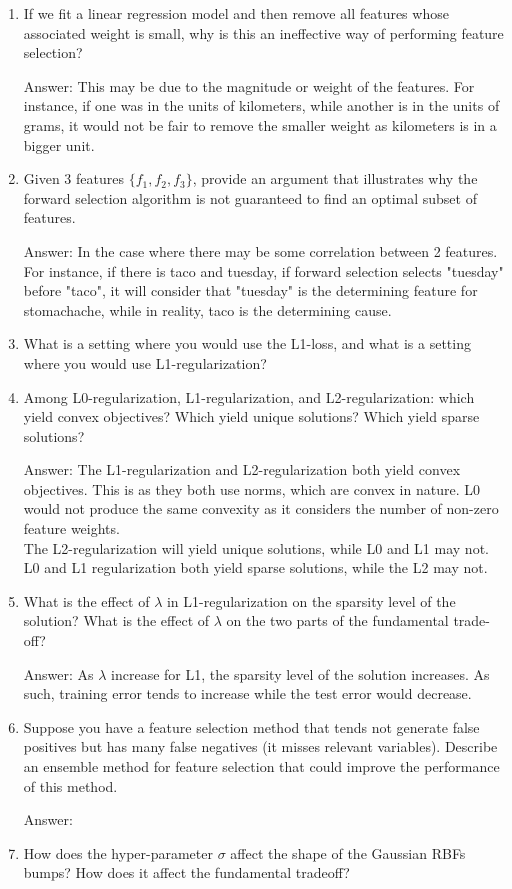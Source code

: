 \documentclass{article}
\def\ans#1{\par\gre{Answer: #1}}
\def\gre#1{{\color{gre}#1}}
\def\enum#1{\begin{enumerate}#1\end{enumerate}}
\begin{document}
\enum{
\item If we fit a linear regression model and then remove all features whose associated weight is small, why is this an ineffective way of performing feature selection?
\ans{This may be due to the magnitude or weight of the features. For instance, if one was in the units of kilometers, while another is in the units of grams, it would not be fair to remove the smaller weight as kilometers is in a bigger unit.}
\item Given $3$ features $\{f_1, f_2, f_3\}$, provide an argument that illustrates why the forward selection algorithm is not guaranteed to find an optimal subset of features.
\ans{In the case where there may be some correlation between 2 features. For instance, if there is taco and tuesday, if forward selection selects "tuesday" before "taco", it will consider that "tuesday" is the determining feature for stomachache, while in reality, taco is the determining cause.}
\item What is a setting where you would use the L1-loss, and what is a setting where you would use L1-regularization?
\item Among L0-regularization, L1-regularization, and L2-regularization: which yield convex objectives? Which yield unique solutions? Which yield sparse solutions?
\ans{The L1-regularization and L2-regularization both yield convex objectives. This is as they both use norms, which are convex in nature. L0 would not produce the same convexity as it considers the number of non-zero feature weights. \\
The L2-regularization will yield unique solutions, while L0 and L1 may not. \\
L0 and L1 regularization both yield sparse solutions, while the L2 may not.
}
\item What is the effect of $\lambda$ in L1-regularization on the sparsity level of the solution? What is the effect of $\lambda$ on the two parts of the fundamental trade-off?
\ans{As $\lambda$ increase for L1, the sparsity level of the solution increases. As such, training error tends to increase while the test error would decrease.}
\item Suppose you have a feature selection method that tends not generate false positives but has many false negatives (it misses relevant variables). Describe an ensemble method for feature selection that could improve the performance of this method.
\ans{}
\item How does the hyper-parameter $\sigma$ affect the shape of the Gaussian RBFs bumps? How does it affect the fundamental tradeoff?
}
\end{document}
